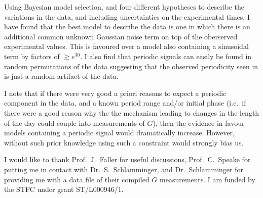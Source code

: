 \documentclass[page-classic]{epl2}
\begin{document}
Using Bayesian model selection, and four different hypotheses to describe the variations in the data, and including
uncertainties on the experimental times, I have found that the best model to describe the data is one in which
there is an additional common unknown Gaussian noise term on top of the oberserved experimental values. This is 
favoured over a model also containing a sinusoidal term by factors of $\gtrsim e^{30}$. I also find that periodic
signals can easily be found in random permutations of the data suggesting that the observed periodicity seen in
\cite{2015EL....11010002A} is just a random artifact of the data.

I note that if there were very good a priori reasons to expect a periodic component in the data, and a known
period range and/or initial phase (i.e.\ if there were a good reason why the the mechanism leading to changes in the
length of the day could couple into measurements of $G$), then the evidence in favour models containing a periodic
signal would dramatically increase. However, without such prior knowledge using such a constraint would strongly bias
us.

\acknowledgements

I would like to thank Prof.\ J.\ Faller for useful discussions, Prof.\ C.\ Speake for putting me in contact with
Dr.\ S.\ Schlamminger, and Dr.\ Schlamminger for providing me with a data file of their compiled $G$ measurements.
I am funded by the STFC under grant ST/L000946/1.



\end{document}
